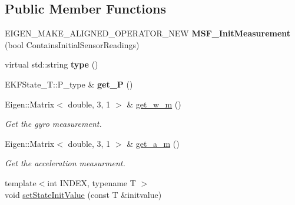 \subsection*{Public Member Functions}
\begin{DoxyCompactItemize}
\item 
\hypertarget{classmsf__core_1_1MSF__InitMeasurement_aaa7c4e7ea351aae40daa3ce32fb37e58}{E\-I\-G\-E\-N\-\_\-\-M\-A\-K\-E\-\_\-\-A\-L\-I\-G\-N\-E\-D\-\_\-\-O\-P\-E\-R\-A\-T\-O\-R\-\_\-\-N\-E\-W {\bfseries M\-S\-F\-\_\-\-Init\-Measurement} (bool Contains\-Initial\-Sensor\-Readings)}\label{classmsf__core_1_1MSF__InitMeasurement_aaa7c4e7ea351aae40daa3ce32fb37e58}

\item 
\hypertarget{classmsf__core_1_1MSF__InitMeasurement_a6ade2a1ba88e5f26de2125258e4c5238}{virtual std\-::string {\bfseries type} ()}\label{classmsf__core_1_1MSF__InitMeasurement_a6ade2a1ba88e5f26de2125258e4c5238}

\item 
\hypertarget{classmsf__core_1_1MSF__InitMeasurement_a19cc3b1efefda7694cca93d1bae441f5}{E\-K\-F\-State\-\_\-\-T\-::\-P\-\_\-type \& {\bfseries get\-\_\-\-P} ()}\label{classmsf__core_1_1MSF__InitMeasurement_a19cc3b1efefda7694cca93d1bae441f5}

\item 
\hypertarget{classmsf__core_1_1MSF__InitMeasurement_af0c9a4a740bc019d8a6a223d469bb42f}{Eigen\-::\-Matrix$<$ double, 3, 1 $>$ \& \hyperlink{classmsf__core_1_1MSF__InitMeasurement_af0c9a4a740bc019d8a6a223d469bb42f}{get\-\_\-w\-\_\-m} ()}\label{classmsf__core_1_1MSF__InitMeasurement_af0c9a4a740bc019d8a6a223d469bb42f}

\begin{DoxyCompactList}\small\item\em Get the gyro measurement. \end{DoxyCompactList}\item 
\hypertarget{classmsf__core_1_1MSF__InitMeasurement_a4c2c7250787e58868c9fc9596ed4c217}{Eigen\-::\-Matrix$<$ double, 3, 1 $>$ \& \hyperlink{classmsf__core_1_1MSF__InitMeasurement_a4c2c7250787e58868c9fc9596ed4c217}{get\-\_\-a\-\_\-m} ()}\label{classmsf__core_1_1MSF__InitMeasurement_a4c2c7250787e58868c9fc9596ed4c217}

\begin{DoxyCompactList}\small\item\em Get the acceleration measurment. \end{DoxyCompactList}\item 
\hypertarget{classmsf__core_1_1MSF__InitMeasurement_a972bcf6e09e13c96849b528c926b3a33}{{\footnotesize template$<$int I\-N\-D\-E\-X, typename T $>$ }\\void \hyperlink{classmsf__core_1_1MSF__InitMeasurement_a972bcf6e09e13c96849b528c926b3a33}{set\-State\-Init\-Value} (const T \&initvalue)}\label{classmsf__core_1_1MSF__InitMeasurement_a972bcf6e09e13c96849b528c926b3a33}


\end{DoxyCompactItemize}

